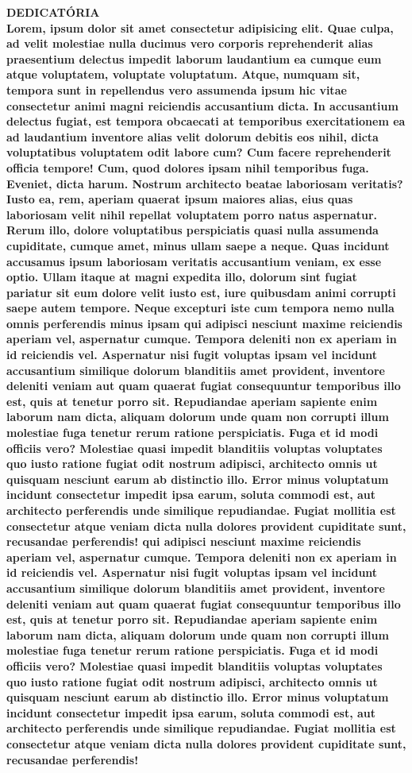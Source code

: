 \documentclass[12pt,a4paper,oneside,brazil]{abntex2}
\begin{document}
\centering
\ABNTEXchapterfont\bfseries{\textsc{\MakeUppercase{Dedicatória}}}\\
\vspace*{3cm}
\justifying
\normalfont
Lorem, ipsum dolor sit amet consectetur adipisicing elit. Quae culpa, ad velit molestiae nulla ducimus vero corporis reprehenderit alias praesentium delectus impedit laborum laudantium ea cumque eum atque voluptatem, voluptate voluptatum. Atque, numquam sit, tempora sunt in repellendus vero assumenda ipsum hic vitae consectetur animi magni reiciendis accusantium dicta. In accusantium delectus fugiat, est tempora obcaecati at temporibus exercitationem ea ad laudantium inventore alias velit dolorum debitis eos nihil, dicta voluptatibus voluptatem odit labore cum? Cum facere reprehenderit officia tempore! Cum, quod dolores ipsam nihil temporibus fuga. Eveniet, dicta harum. Nostrum architecto beatae laboriosam veritatis? Iusto ea, rem, aperiam quaerat ipsum maiores alias, eius quas laboriosam velit nihil repellat voluptatem porro natus aspernatur. Rerum illo, dolore voluptatibus perspiciatis quasi nulla assumenda cupiditate, cumque amet, minus ullam saepe a neque. Quas incidunt accusamus ipsum laboriosam veritatis accusantium veniam, ex esse optio. Ullam itaque at magni expedita illo, dolorum sint fugiat pariatur sit eum dolore velit iusto est, iure quibusdam animi corrupti saepe autem tempore. Neque excepturi iste cum tempora nemo nulla omnis perferendis minus ipsam qui adipisci nesciunt maxime reiciendis aperiam vel, aspernatur cumque. Tempora deleniti non ex aperiam in id reiciendis vel. Aspernatur nisi fugit voluptas ipsam vel incidunt accusantium similique dolorum blanditiis amet provident, inventore deleniti veniam aut quam quaerat fugiat consequuntur temporibus illo est, quis at tenetur porro sit. Repudiandae aperiam sapiente enim laborum nam dicta, aliquam dolorum unde quam non corrupti illum molestiae fuga tenetur rerum ratione perspiciatis. Fuga et id modi officiis vero? Molestiae quasi impedit blanditiis voluptas voluptates quo iusto ratione fugiat odit nostrum adipisci, architecto omnis ut quisquam nesciunt earum ab distinctio illo. Error minus voluptatum incidunt consectetur impedit ipsa earum, soluta commodi est, aut architecto perferendis unde similique repudiandae. Fugiat mollitia est consectetur atque veniam dicta nulla dolores provident cupiditate sunt, recusandae perferendis!
qui adipisci nesciunt maxime reiciendis aperiam vel, aspernatur cumque. Tempora deleniti non ex aperiam in id reiciendis vel. Aspernatur nisi fugit voluptas ipsam vel incidunt accusantium similique dolorum blanditiis amet provident, inventore deleniti veniam aut quam quaerat fugiat consequuntur temporibus illo est, quis at tenetur porro sit. Repudiandae aperiam sapiente enim laborum nam dicta, aliquam dolorum unde quam non corrupti illum molestiae fuga tenetur rerum ratione perspiciatis. Fuga et id modi officiis vero? Molestiae quasi impedit blanditiis voluptas voluptates quo iusto ratione fugiat odit nostrum adipisci, architecto omnis ut quisquam nesciunt earum ab distinctio illo. Error minus voluptatum incidunt consectetur impedit ipsa earum, soluta commodi est, aut architecto perferendis unde similique repudiandae. Fugiat mollitia est consectetur atque veniam dicta nulla dolores provident cupiditate sunt, recusandae perferendis!
\end{document}
